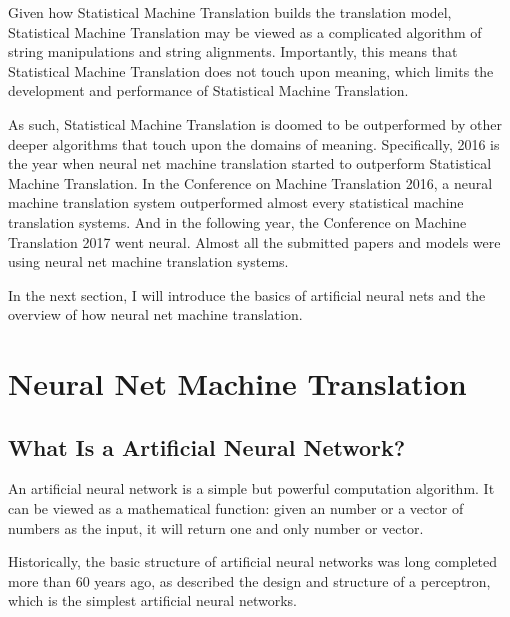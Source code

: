 Given how Statistical Machine Translation builds the translation model, Statistical Machine Translation may be viewed as a complicated algorithm of string manipulations and string alignments. 
Importantly, this means that Statistical Machine Translation does not touch upon meaning, which limits the development and performance of Statistical Machine Translation. 

As such, Statistical Machine Translation is doomed to be outperformed by other deeper algorithms that touch upon the domains of meaning. Specifically, 2016 is the year when neural net machine translation started to outperform Statistical Machine Translation. In the Conference on Machine Translation 2016, a neural machine translation system outperformed almost every statistical machine translation systems. And in the following year, the Conference on Machine Translation 2017 went neural. Almost all the submitted papers and models were using neural net machine translation systems. 

In the next section, I will introduce the basics of artificial neural nets and the overview of how neural net machine translation.  

\section{Neural Net Machine Translation}\label{neural_MT}

\subsection{What Is a Artificial Neural Network?}

An artificial neural network is a simple but powerful computation algorithm. It can be viewed as a mathematical function: given an number or a vector of numbers as the input, it will return one and only number or vector. 

Historically, the basic structure of artificial neural networks was long completed more than 60 years ago, 
as \citet{rosenblatt} described the design and structure of a perceptron, which is the simplest artificial neural networks. 

